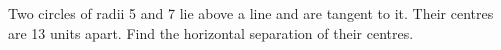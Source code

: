 Two circles of radii 5 and 7 lie above a line and are tangent to it. Their centres are 13 units apart. Find the horizontal separation of their centres.
